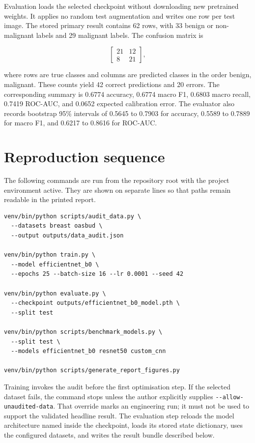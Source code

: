 Evaluation loads the selected checkpoint without downloading new pretrained weights. It applies no random test augmentation and writes one row per test image. The stored primary result contains 62 rows, with 33 benign or non-malignant labels and 29 malignant labels. The confusion matrix is

\begin{equation}
\begin{bmatrix}
21 & 12 \\
8 & 21
\end{bmatrix},
\end{equation}

where rows are true classes and columns are predicted classes in the order benign, malignant. These counts yield 42 correct predictions and 20 errors. The corresponding summary is 0.6774 accuracy, 0.6774 macro F1, 0.6803 macro recall, 0.7419 ROC-AUC, and 0.0652 expected calibration error. The evaluator also records bootstrap 95\% intervals of 0.5645 to 0.7903 for accuracy, 0.5589 to 0.7889 for macro F1, and 0.6217 to 0.8616 for ROC-AUC.

\section{Reproduction sequence}

The following commands are run from the repository root with the project environment active. They are shown on separate lines so that paths remain readable in the printed report.

\begin{verbatim}
venv/bin/python scripts/audit_data.py \
  --datasets breast oasbud \
  --output outputs/data_audit.json

venv/bin/python train.py \
  --model efficientnet_b0 \
  --epochs 25 --batch-size 16 --lr 0.0001 --seed 42

venv/bin/python evaluate.py \
  --checkpoint outputs/efficientnet_b0_model.pth \
  --split test

venv/bin/python scripts/benchmark_models.py \
  --split test \
  --models efficientnet_b0 resnet50 custom_cnn

venv/bin/python scripts/generate_report_figures.py
\end{verbatim}

Training invokes the audit before the first optimisation step. If the selected dataset fails, the command stops unless the author explicitly supplies \texttt{-{}-allow-unaudited-data}. That override marks an engineering run; it must not be used to support the validated headline result. The evaluation step reloads the model architecture named inside the checkpoint, loads its stored state dictionary, uses the configured datasets, and writes the result bundle described below.


